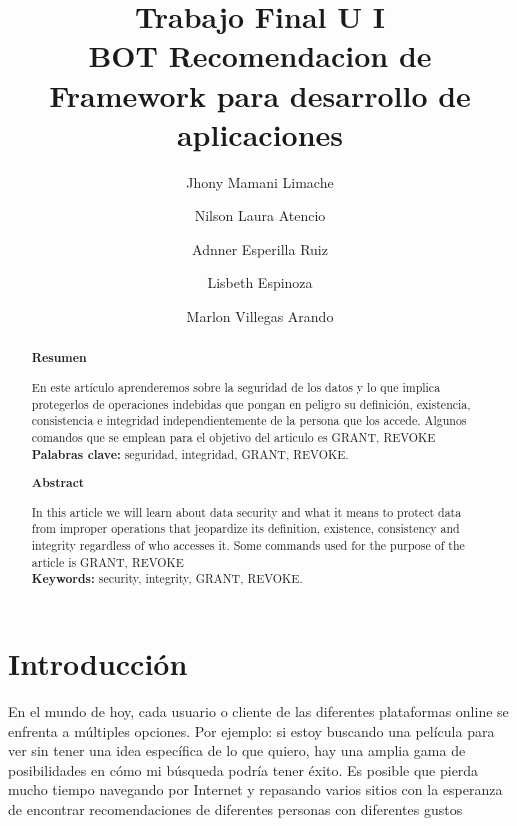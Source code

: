 \documentclass[%
 reprint,
 amsmath,amssymb,
 aps,
]{revtex4-1}
\begin{document}
\title{Trabajo Final U I  \\ BOT Recomendacion de Framework para desarrollo de aplicaciones }
\author{Jhony Mamani Limache}
\author{Nilson Laura Atencio}
\author{Adnner Esperilla Ruiz}
\author{Lisbeth Espinoza}
\author{Marlon Villegas Arando}
%

\begin{abstract}
\begin{center}
\textbf{Resumen}
\end{center}

En este artículo aprenderemos sobre la seguridad de los datos y lo que implica protegerlos de operaciones indebidas que pongan en peligro su definición, existencia, consistencia e integridad independientemente de la persona que los accede. Algunos comandos que se emplean para el objetivo del articulo es GRANT, REVOKE\\

\textbf{Palabras clave:}   seguridad, integridad, GRANT, REVOKE.\\

\begin{center}
\textbf{Abstract}
\end{center}
In this article we will learn about data security and what it means to protect data from improper operations that jeopardize its definition, existence, consistency and integrity regardless of who accesses it. Some commands used for the purpose of the article is GRANT, REVOKE\\
\textbf{Keywords:}   security, integrity, GRANT, REVOKE.\\

\end{abstract}



\maketitle


\section {Introducción}\label{sec:1}

En el mundo de hoy, cada usuario o cliente de las diferentes plataformas online se enfrenta a múltiples opciones. Por ejemplo: si estoy buscando una película para ver sin tener una idea específica de lo que quiero, hay una amplia gama de posibilidades en cómo mi búsqueda podría tener éxito. Es posible que pierda mucho tiempo navegando por Internet y repasando varios sitios con la esperanza de encontrar recomendaciones de diferentes personas con diferentes gustos
\end{document}

